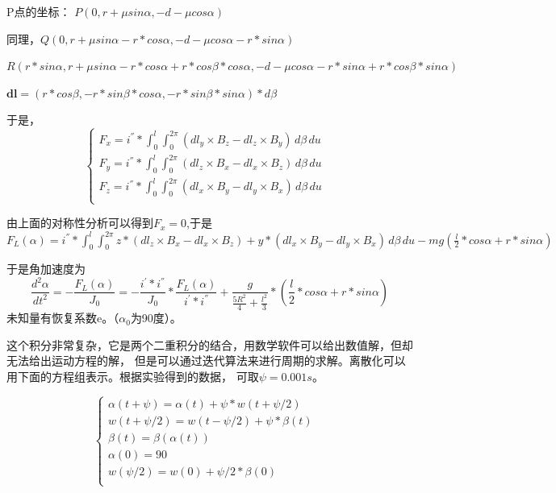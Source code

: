\documentclass[AutoFakeBold]{LZUThesis}
\begin{document}
P点的坐标：
$P(0, r+\mu sin\alpha, -d-\mu cos\alpha)$

同理，$Q(0, r+\mu sin\alpha-r*cos\alpha, -d-\mu cos\alpha -r*sin\alpha)$

$R(r*sin\alpha, r+\mu sin\alpha-r*cos\alpha+r*cos\beta*cos\alpha, -d-\mu cos\alpha -r*sin\alpha+r*cos\beta*sin\alpha)$

$\textbf{dl} = (r*cos\beta, -r*sin\beta*cos\alpha, -r*sin\beta*sin\alpha)*d\beta$

于是，
\begin{equation}
\left \{
\begin{array}{lr}
F_x = i^{''}*\int_{0}^{l}\int_{0}^{2\pi}  (dl_{y} \times B_{z} - dl_{z} \times B_{y})\,d\beta\,du & \\
F_y = i^{''}*\int_{0}^{l}\int_{0}^{2\pi}  (dl_{z} \times B_{x} - dl_{x} \times B_{z})\,d\beta\,du & \\
F_z = i^{''}*\int_{0}^{l}\int_{0}^{2\pi}  (dl_{x} \times B_{y} - dl_{y} \times B_{x})\,d\beta\,du & \\
\end{array}
\right.
\end{equation}

由上面的对称性分析可以得到$F_{x} = 0$,于是$F_{L}(\alpha) = i^{''}*\int_{0}^{l}\int_{0}^{2\pi}  
z*(dl_{z} \times B_{x} - dl_{x} \times B_{z}) + y*(dl_{x} \times B_{y} - dl_{y} \times B_{x})\,
d\beta\,du -mg(\frac{l}{2}*cos\alpha + r*sin\alpha)$

于是角加速度为
\begin{equation}
    \frac{d^{2}\alpha}{dt^{2}} = -\frac{F_{L}(\alpha)}{J_{0}}
    =-\frac{i^{'}*i^{''}}{J_{0}}*\frac{F_{L}(\alpha)}{i^{'}*i^{''}} + \frac{g}{\frac{5R^2}{4} + \frac{l^2}{3}}*(\frac{l}{2}*cos\alpha + r*sin\alpha)
\end{equation}
未知量有恢复系数e。（$\alpha_{0}$为90度）。

这个积分非常复杂，它是两个二重积分的结合，用数学软件可以给出数值解，但却无法给出运动方程的解，
但是可以通过迭代算法来进行周期的求解。离散化可以用下面的方程组表示。根据实验得到的数据，
可取$\psi = 0.001s$。

\begin{equation}
    \left \{
    \begin{array}{lr}
    \alpha(t+\psi) = \alpha(t) + \psi*w(t+\psi /2) & \\
    w(t+\psi /2) = w(t-\psi /2) + \psi*\beta(t) & \\
    \beta(t) =\beta(\alpha(t)) & \\
    \alpha(0) = 90 & \\
    w(\psi /2) = w(0) + \psi /2*\beta(0) & \\
    \end{array}
    \right.
\end{equation}
\end{document}
